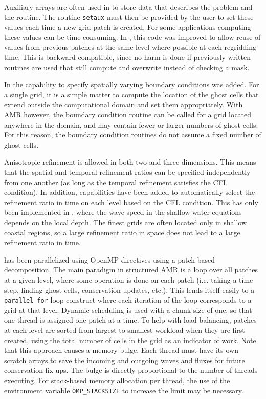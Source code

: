 Auxiliary arrays are often used in \clawpack to store data that
describes the problem and the routine.
The routine \texttt{setaux} must then be provided by the user to set these values each time a
new grid patch is created.  For some applications computing these values can be time-consuming.  In ,
this code was improved to allow reuse of values from previous patches at
the same level where possible at each regridding time.
This is backward compatible, since no harm is done if previously
written routines are used that still compute and overwrite instead of
checking a mask.

In  the capability to specify spatially varying boundary
conditions was added. For a single grid, it is a simple matter to
compute the location of the ghost cells that extend outside the
computational domain and set them appropriately.  With AMR however,
the boundary condition routine can be called for a grid located
anywhere in the domain, and may contain fewer or larger numbers of
ghost cells. For this reason, the boundary condition routines
 do not assume a fixed number of ghost cells.

Anisotropic refinement is allowed in both two and three dimensions.
This means that the spatial and temporal refinement ratios can be
specified independently from one another (as long as the temporal
refinement satisfies the CFL condition).  In addition, capabilities
have been added to automatically select the refinement ratio in time  on each
level based on the CFL condition.  This has only been implemented in
\geoclaw. where the wave speed in the shallow water equations
depends on the local depth. The finest grids are often located only in
shallow coastal regions, so a large refinement ratio in space does not
lead to a large refinement ratio in time.

\amrclaw has been
parallelized using OpenMP directives using a  patch-based decomposition.
The main paradigm in structured AMR is a loop over all patches at a given level, where
some operation is done on each patch (i.e. taking a time step, finding ghost
cells, conservation updates, etc.).  This lends itself easily to a {\tt parallel
for} loop construct where each iteration of the loop corresponds to a grid at
that level. Dynamic scheduling is used with a chunk size of one, so that one
thread is assigned one patch at a time. To help with load balancing, patches at
each level are sorted from largest to smallest workload when they are first
created, using the total number of cells in the grid as an indicator of work.
Note that this approach causes a memory bulge. Each thread must have its own
scratch arrays to save the incoming and outgoing waves and fluxes for future
conservation fix-ups. The bulge is directly proportional to the number of
threads executing. For stack-based memory allocation per thread, the use of the
environment variable {\tt OMP\_STACKSIZE} to increase the limit may be
necessary.

